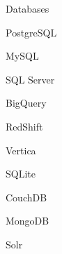 \begin{skillset}{Databases}
  \item PostgreSQL
  \item MySQL
  \item SQL Server
  \item BigQuery
  \item RedShift
  \item Vertica
  \item SQLite
  \item CouchDB
  \item MongoDB
  \item Solr
\end{skillset}

